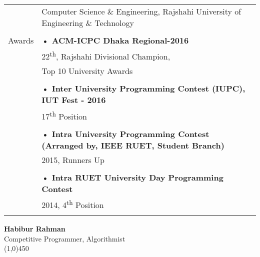 \documentclass[letterpaper,11pt,oneside]{article}
\begin{document}
\begin{tabular}{@{} l l}
     & Computer Science \& Engineering, Rajshahi University of Engineering \& Technology\\
     \\
  \Large{Awards}      & \textbf{• ACM-ICPC Dhaka Regional-2016} \\
     & \parbox{5.0in}{22\textsuperscript{th}, Rajshahi Divisional Champion,} \\
     & \parbox{5.0in}{Top 10 University Awards}\\
     & \\
     & \textbf{• Inter University Programming Contest (IUPC), IUT Fest - 2016} \\
     & \parbox{5.0in}{17\textsuperscript{th} Position} \\
     & \\
     & \textbf{• Intra University Programming Contest (Arranged by, IEEE RUET, Student Branch)} \\
     & \parbox{5.0in}{2015, Runners Up} \\
     & \\
     & \textbf{• Intra RUET University Day Programming Contest} \\
     & \parbox{5.0in}{2014, 4\textsuperscript{th} Position} \\
     & \\
\end{tabular}
\newpage
\center  \LARGE{\textbf{Habibur Rahman}} \\ \small{Competitive Programmer, Algorithmist} \\
\vspace{-1ex}
{\line(1,0){450}}
\vspace{2em}
\noindent 
\end{document}
